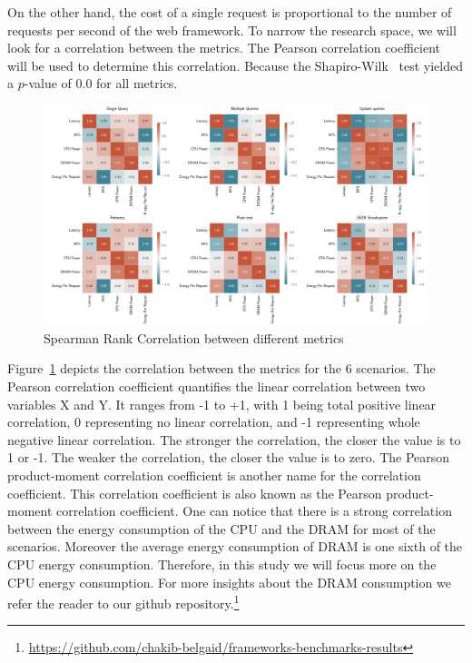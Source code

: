 On the other hand, the cost of a single request is proportional to the number of requests per second of the web framework.
To narrow the research space, we will look for a correlation between the metrics.
The Pearson correlation coefficient~\cite{zar2005spearman} will be used to determine this correlation.
Because the Shapiro-Wilk~\cite{shapiro1968comparative} test yielded a $p$-value of 0.0 for all metrics.
\begin{figure}[htb]
    \centering
    \includegraphics[width=\textwidth]{imgs/correlation_all}
    \caption{Spearman Rank Correlation between different metrics}
    \label{fig:correlation}
\end{figure}

Figure~\ref{fig:correlation} depicts the correlation between the metrics for the 6 scenarios.
The Pearson correlation coefficient quantifies the linear correlation between two variables X and Y.
It ranges from -1 to +1, with 1 being total positive linear correlation, 0 representing no linear correlation, and -1 representing whole negative linear correlation.
The stronger the correlation, the closer the value is to 1 or -1.
The weaker the correlation, the closer the value is to zero.
The Pearson product-moment correlation coefficient is another name for the correlation coefficient.
This correlation coefficient is also known as the Pearson product-moment correlation coefficient.
One can notice that there is a strong correlation between the energy consumption of the CPU and the DRAM for most of the scenarios.
Moreover the average energy consumption of DRAM is one sixth of the CPU energy consumption.
Therefore, in this study we will focus more on the CPU energy consumption.
For more insights about the DRAM consumption we refer the reader to our github repository.\footnote{\url{https://github.com/chakib-belgaid/frameworks-benchmarks-results}}


